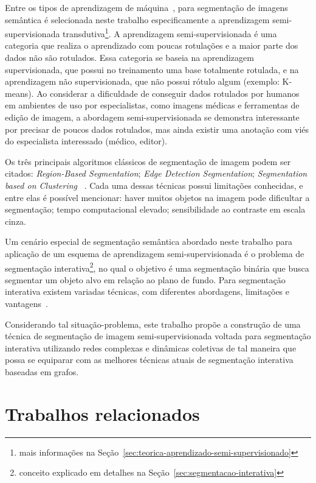 Entre os tipos de aprendizagem de máquina~\cite{sah2020machine}, para
segmentação de imagens semântica é selecionada neste trabalho
especificamente a aprendizagem semi-supervisionada
transdutiva\footnote{mais informações na
Seção~\ref{sec:teorica-aprendizado-semi-supervisionado}}. A
aprendizagem semi-supervisionada é uma categoria que realiza o
aprendizado com poucas rotulações e a maior parte dos dados não são
rotulados. Essa categoria se baseia na aprendizagem supervisionada,
que possui no treinamento uma base totalmente rotulada, e na
aprendizagem não supervisionada, que não possui rótulo algum (exemplo:
K-means). Ao considerar a dificuldade de conseguir dados rotulados por
humanos em ambientes de uso por especialistas, como imagens médicas e
ferramentas de edição de imagem, a abordagem semi-supervisionada se
demonstra interessante por precisar de poucos dados rotulados, mas
ainda existir uma anotação com viés do especialista interessado
(médico, editor).


Os três principais algoritmos clássicos de segmentação de imagem podem
ser citados: \textit{Region-Based Segmentation}; \textit{Edge Detection
  Segmentation}; \textit{Segmentation based on Clustering}
~\cite{ImageSegmentationTechniques1985}. Cada uma dessas técnicas
possui limitações conhecidas, e entre elas é possível mencionar: haver
muitos objetos na imagem pode dificultar a segmentação; tempo
computacional elevado; sensibilidade ao contraste em escala cinza.

Um cenário especial de segmentação semântica abordado neste trabalho
para aplicação de um esquema de aprendizagem semi-supervisionada é o
problema de segmentação interativa\footnote{conceito explicado em
detalhes na Seção~\ref{sec:segmentacao-interativa}}, no qual o
objetivo é uma segmentação binária que busca segmentar um objeto alvo
em relação ao plano de fundo. Para segmentação interativa existem
variadas técnicas, com diferentes abordagens, limitações e
vantagens~\cite{ramadan2020survey}.

Considerando tal situação-problema, este trabalho propõe a construção
de uma técnica de segmentação de imagem semi-supervisionada voltada
para segmentação interativa utilizando redes complexas e dinâmicas
coletivas de tal maneira que possa se equiparar com as melhores técnicas
atuais de segmentação interativa baseadas em grafos.

\section{Trabalhos relacionados}\label{cap:trabalhos-relacionados}

